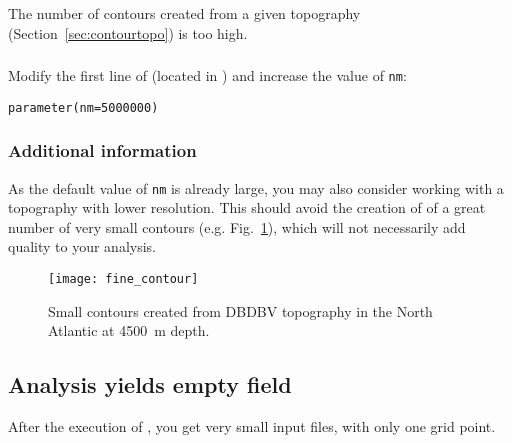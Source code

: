 \subsubsection{\question}

The number of contours created from a given topography (Section~\ref{sec:contourtopo}) is too high. 

\subsubsection{\answer}

Modify the first line of  (located in ) and increase the value of \texttt{nm}:
\begin{verbatim}
parameter(nm=5000000)
\end{verbatim}

\subsubsection{Additional information}

As the default value of \texttt{nm} is already large, you may also consider working with a topography with lower resolution. This should avoid the creation of of a great number of very small contours (e.g. Fig.~\ref{fig:smallcont}), which will not necessarily add quality to your analysis.


\begin{figure}[htpb]
\centering
\parbox{.65\textwidth}{
\texttt{[image: fine\_contour]}
}\parbox{.35\textwidth}{
\caption[Small contours]{Small contours created from DBDBV topography in the North Atlantic at 4500~m depth\label{fig:smallcont}.}
}
\end{figure}
 


%





\subsection{Analysis yields empty field}


After the execution of , you get very small input files, with only one grid point.

